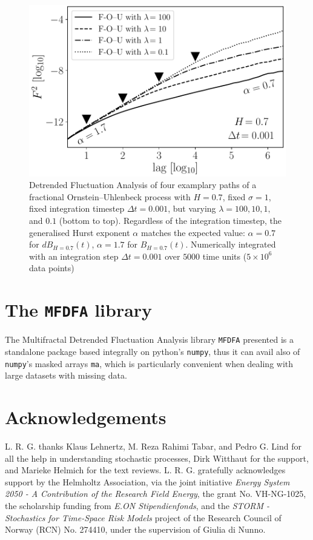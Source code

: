 \documentclass[pre, a4paper, aps, floatfix, superscriptaddress, onecolumn, notitlepage]{revtex4-1} %
\begin{document}
\begin{figure}[h]
  \includegraphics[width = 0.5\linewidth]{fig2.pdf}
  \caption{Detrended Fluctuation Analysis of four examplary paths of a fractional Ornstein--Uhlenbeck process with $H=0.7$, fixed $\sigma = 1$, fixed integration timestep $\Delta t = 0.001$, but varying $\lambda = 100, 10, 1,$ and $0.1$ (bottom to top).
  Regardless of the integration timestep, the generalised Hurst exponent $\alpha$ matches the expected value: $\alpha = 0.7$ for $dB_{H=0.7}(t)$, $\alpha = 1.7$ for $B_{H=0.7}(t)$.
  Numerically integrated with an integration step $\Delta t = 0.001$ over $5000$ time units ($5\times10^6$ data points)}\label{fig:5}
\end{figure}

\section{The \texttt{MFDFA} library}
The Multifractal Detrended Fluctuation Analysis library \texttt{MFDFA} presented is a standalone package based integrally on python's \texttt{numpy}, thus it can avail also of \texttt{numpy}'s masked arrays \texttt{ma}, which is particularly convenient when dealing with large datasets with missing data.


\section*{Acknowledgements}
L. R. G. thanks Klaus Lehnertz, M. Reza Rahimi Tabar, and Pedro G. Lind for all the help in understanding stochastic processes, Dirk Witthaut for the support, and Marieke Helmich for the text reviews.
L. R. G. gratefully acknowledges support by the Helmholtz Association, via the joint initiative \textit{Energy System 2050 - A Contribution of the Research Field Energy}, the grant No. VH-NG-1025, the scholarship funding from \textit{E.ON Stipendienfonds}, and the \textit{STORM - Stochastics for Time-Space Risk Models} project of the Research Council of Norway (RCN) No. 274410, under the supervision of Giulia di Nunno.


\end{document}
